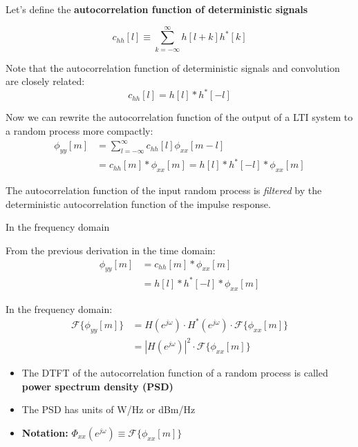 \documentclass[10pt, handout]{beamer}
\begin{document}
\begin{frame}
Let's define the \textbf{autocorrelation function of deterministic signals}

\begin{equation*}
c_{hh}[l] \equiv \displaystyle\sum_{k=-\infty}^{\infty} h[l+k]h^*[k]
\end{equation*} 

\pause
Note that the autocorrelation function of deterministic signals and convolution are closely related:
\begin{equation*}
c_{hh}[l] = h[l]\ast h^*[-l]
\end{equation*} 

\pause
Now we can rewrite the autocorrelation function of the output of a LTI system to a random process more compactly:
\begin{align*}
\phi_{yy}[m] &= \sum_{l=-\infty}^{\infty} c_{hh}[l]\phi_{xx}[m-l] \\
&= c_{hh}[m]\ast \phi_{xx}[m] = h[l]\ast h^*[-l] \ast \phi_{xx}[m]
\end{align*} 

\pause
The autocorrelation function of the input random process is \textit{filtered} by the deterministic autocorrelation function of the impulse response.

\end{frame}

\begin{frame}{In the frequency domain}

From the previous derivation in the time domain:
\begin{align*}
\phi_{yy}[m] &= c_{hh}[m]\ast \phi_{xx}[m] \\
&= h[l]\ast h^*[-l]\ast \phi_{xx}[m]
\end{align*}

\pause
In the frequency domain:
\begin{align*}
\mathcal{F}\{\phi_{yy}[m]\} &= H(e^{j\omega})\cdot  H^*(e^{j\omega})\cdot \mathcal{F}\{\phi_{xx}[m]\} \\
&= |H(e^{j\omega})|^2\cdot\mathcal{F}\{\phi_{xx}[m]\}
\end{align*}

\begin{itemize}
	\pause\item The DTFT of the autocorrelation function of a random process is called \textbf{power spectrum density (PSD)}
	\pause\item The PSD has units of W/Hz or dBm/Hz
	\pause\item \textbf{Notation:} $\Phi_{xx}(e^{j\omega}) \equiv \mathcal{F}\{\phi_{xx}[m]\}$
\end{itemize}
\end{frame}
\end{document}
